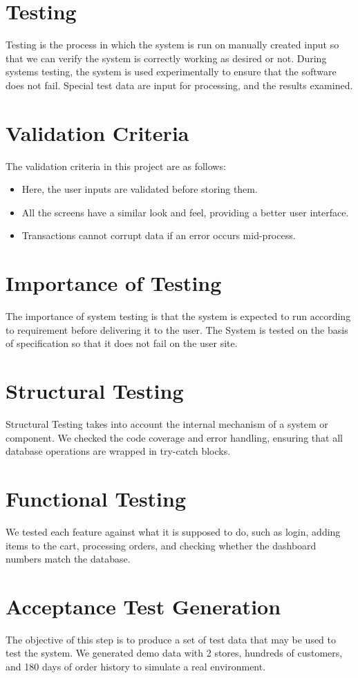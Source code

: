 \documentclass[12pt,a4paper]{report}
\begin{document}
\section{Testing}
Testing is the process in which the system is run on manually created input so that we can verify the system is correctly working as desired or not. During systems testing, the system is used experimentally to ensure that the software does not fail. Special test data are input for processing, and the results examined.

\section{Validation Criteria}
The validation criteria in this project are as follows:
\begin{itemize}
    \item Here, the user inputs are validated before storing them.
    \item All the screens have a similar look and feel, providing a better user interface.
    \item Transactions cannot corrupt data if an error occurs mid-process.
\end{itemize}

\section{Importance of Testing}
The importance of system testing is that the system is expected to run according to requirement before delivering it to the user. The System is tested on the basis of specification so that it does not fail on the user site.

\section{Structural Testing}
Structural Testing takes into account the internal mechanism of a system or component. We checked the code coverage and error handling, ensuring that all database operations are wrapped in try-catch blocks.

\section{Functional Testing}
We tested each feature against what it is supposed to do, such as login, adding items to the cart, processing orders, and checking whether the dashboard numbers match the database.

\section{Acceptance Test Generation}
The objective of this step is to produce a set of test data that may be used to test the system. We generated demo data with 2 stores, hundreds of customers, and 180 days of order history to simulate a real environment.
\end{document}
